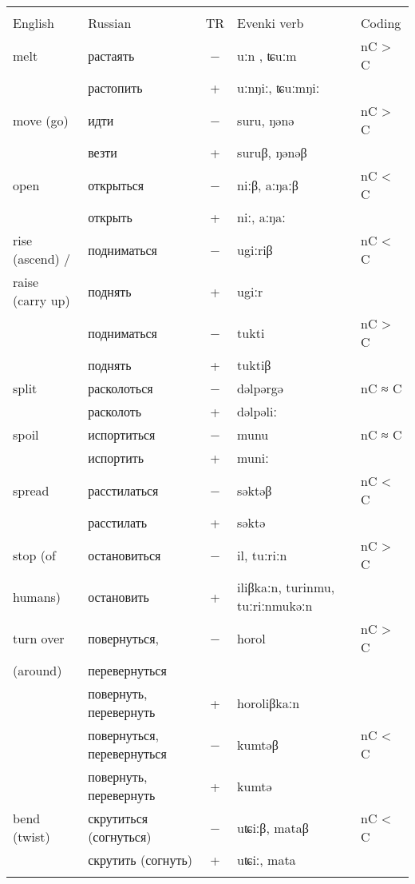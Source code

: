\documentclass[output=paper,colorlinks,citecolor=brown]{langscibook}
\begin{document}
\begin{paperappendix}
\begin{table}[H]
\begin{tabularx}{\textwidth}{ l  l c Q l}
\lsptoprule
{} & \\\cmidrule(lr){1-2}
English  & Russian &	TR &	Evenki verb &	Coding\\
\midrule
melt &	растаять &	− &	uːn , ʨuːm &	nC > C\\
 &	растопить &	+ &	uːnŋiː, ʨuːmŋiː &	\\
\midrule
move (go) &	идти &	− &	suru, ŋənə &	nC > C\\
 &	везти &	+ &	suruβ, ŋənəβ &	\\
\midrule
open &	открыться &	− &	niːβ, aːŋaːβ &	nC < C\\
 &	открыть &	+ &	niː, aːŋaː &	\\
\midrule
rise (ascend) / &	подниматься & − &	ugiːriβ &	nC < C\\
raise (carry up) &	поднять & 	+ &	ugiːr &	\\
 &	подниматься &	− &	tukti &	nC > C\\
 &	поднять  &	+ &	tuktiβ &	\\
\midrule
split &	расколоться &	− &	dəlpərgə &	nC  ≈ C\\
 &	расколоть &	+ &	dəlpəliː &	\\
\midrule
spoil &	испортиться	 & − &	munu &	nC  ≈ C\\
 &	испортить &	+ &	muniː &	\\
\midrule
spread &	расстилаться &	− &	səktəβ &	nC < C\\
 &	расстилать &	+ &	səktə &	\\
\midrule
stop (of &	остановиться &	− &	il, tuːriːn &	nC > C\\
humans) &	остановить &	+ &	iliβkaːn, turinmu, tuːriːnmukəːn &	\\
\midrule
turn over  &	повернуться,  &	− &	horol &	nC > C\\
(around) & перевернуться & \\
 &	повернуть, перевернуть &	+ &	horoliβkaːn &	\\
 &	повернуться, перевернуться &	− &	kumtəβ &	nC < C\\
 &	повернуть, перевернуть &	+ &	kumtə &	\\
\midrule
bend (twist) &	скрутиться (согнуться) &	− &	uʨiːβ, mataβ &	nC < C\\
 &	скрутить (согнуть) &	+ &	uʨiː, mata &	\\
  \lspbottomrule
\end{tabularx}
\label{table:2Appendix3c}
\end{table}



\end{paperappendix}
\end{document}
